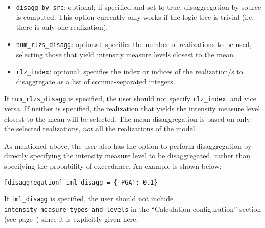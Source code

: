 \begin{itemize}
    \item \Verb+disagg_by_src+: optional; if specified and set to true,
	    disaggregation by source is computed. This option currently only
		works if the logic tree is trivial (i.e. there is only one
		realization).

    \item \Verb+num_rlzs_disagg+: optional; specifies the number of realizations
	    to be used, selecting those that yield intensity measure levels
		closest to the mean.  

    \item \Verb+rlz_index+: optional; specifies the index or indices of
	    the realization/s to disaggregate as a list of comma-separated
		integers.

\end{itemize}

If \texttt{num\_rlzs\_disagg} is specified, the user should not specify
\texttt{rlz\_index}, and vice versa. If neither is specified, the
realization that yields the intensity measure level closest to the mean will be
selected. The mean disaggregation is based on only the selected realizations,
$not$ all the realizations of the model.  

As mentioned above, the user also has the option to perform disaggregation by
directly specifying the intensity measure level to be disaggregated, rather than
specifying the probability of exceedance. An example is shown below:

\begin{verbatim}
[disaggregation] iml_disagg = {'PGA': 0.1} \end{verbatim}

If \texttt{iml\_disagg} is specified, the user should not include
\texttt{intensity\_measure\_types\_and\_levels} in the ``Calculation
configuration'' section (see page~\pageref{sec:calculation_configuration}) since
it is explicitly given here.
